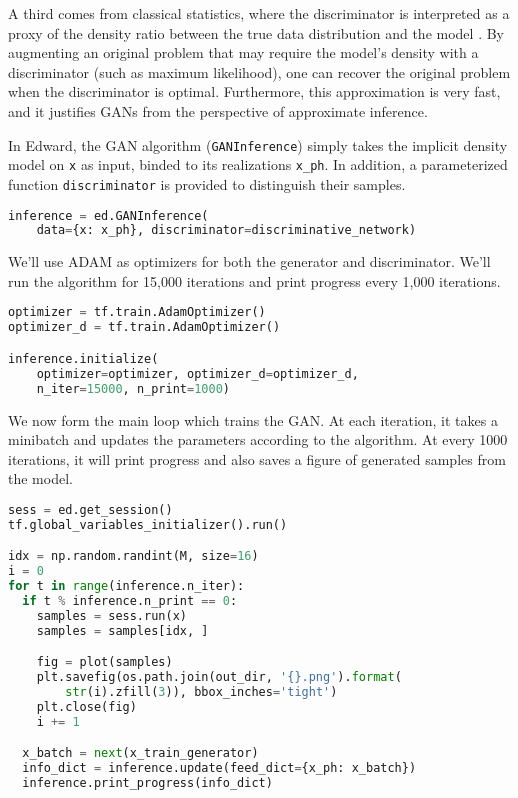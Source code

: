 A third comes from classical statistics, where the discriminator is
interpreted as a proxy of the density ratio between the true data
distribution and the model
\citep{sugiyama2012density,mohamed2016learning}. By augmenting an
original problem that may require the model's density with a
discriminator (such as maximum likelihood), one can recover the
original problem when the discriminator is optimal. Furthermore, this
approximation is very fast, and it justifies GANs from the perspective
of approximate inference.

In Edward, the GAN algorithm (\texttt{GANInference}) simply takes the
implicit density model on \texttt{x} as input, binded to its
realizations \texttt{x_ph}. In addition, a parameterized function
\texttt{discriminator} is provided to distinguish their
samples.

\begin{lstlisting}[language=Python]
inference = ed.GANInference(
    data={x: x_ph}, discriminator=discriminative_network)
\end{lstlisting}

We'll use ADAM as optimizers for both the generator and discriminator.
We'll run the algorithm for 15,000 iterations and print progress every
1,000 iterations.

\begin{lstlisting}[language=Python]
optimizer = tf.train.AdamOptimizer()
optimizer_d = tf.train.AdamOptimizer()

inference.initialize(
    optimizer=optimizer, optimizer_d=optimizer_d,
    n_iter=15000, n_print=1000)
\end{lstlisting}

We now form the main loop which trains the GAN. At each iteration, it
takes a minibatch and updates the parameters according to the
algorithm. At every 1000 iterations, it will print progress and also
saves a figure of generated samples from the model.

\begin{lstlisting}[language=Python]
sess = ed.get_session()
tf.global_variables_initializer().run()

idx = np.random.randint(M, size=16)
i = 0
for t in range(inference.n_iter):
  if t % inference.n_print == 0:
    samples = sess.run(x)
    samples = samples[idx, ]

    fig = plot(samples)
    plt.savefig(os.path.join(out_dir, '{}.png').format(
        str(i).zfill(3)), bbox_inches='tight')
    plt.close(fig)
    i += 1

  x_batch = next(x_train_generator)
  info_dict = inference.update(feed_dict={x_ph: x_batch})
  inference.print_progress(info_dict)
\end{lstlisting}

